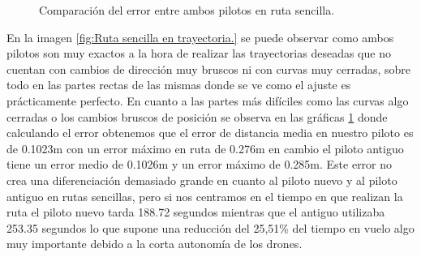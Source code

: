 \begin{figure}[H]
 \centering
 \caption{Comparación del error entre ambos pilotos en ruta sencilla.}
 \label{f:Comparativa del error sencilla.}
\end{figure} 

\hspace{1cm} En la imagen \ref{fig:Ruta sencilla en trayectoria.} se puede observar como ambos pilotos son muy exactos a la hora de realizar las trayectorias deseadas que no cuentan con cambios de dirección muy bruscos ni con curvas muy cerradas, sobre todo en las partes rectas de las mismas donde se ve como el ajuste es prácticamente perfecto. En cuanto a las partes más difíciles como las curvas algo cerradas o los cambios bruscos de posición se observa en las gráficas \ref{f:Comparativa del error sencilla.} donde calculando el error obtenemos que el error de distancia media en nuestro piloto es de 0.1023m con un error máximo en ruta de 0.276m en cambio el piloto antiguo tiene un error medio de 0.1026m y un error máximo de 0.285m. Este error no crea una diferenciación demasiado grande en cuanto al piloto nuevo y al piloto antiguo en rutas sencillas, pero si nos centramos en el tiempo en que realizan la ruta el piloto nuevo tarda 188.72 segundos mientras que el antiguo utilizaba 253.35 segundos lo que supone una reducción del 25,51\% del tiempo en vuelo algo muy importante debido a la corta autonomía de los drones.

